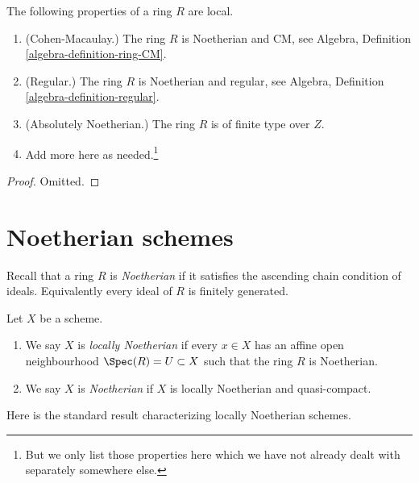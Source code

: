 \begin{lemma}
\label{lemma-properties-local}
The following properties of a ring $R$ are local.
\begin{enumerate}
\item (Cohen-Macaulay.)
The ring $R$ is Noetherian and CM, see
Algebra, Definition \ref{algebra-definition-ring-CM}.
\item (Regular.)
The ring $R$ is Noetherian and regular, see
Algebra, Definition \ref{algebra-definition-regular}.
\item (Absolutely Noetherian.)
The ring $R$ is of finite type over $Z$.
\item Add more here as needed.\footnote{But we only list those properties
here which we have not already dealt with separately somewhere else.}
\end{enumerate}
\end{lemma}

\begin{proof}
Omitted.
\end{proof}















\section{Noetherian schemes}
\label{section-noetherian}

\noindent
Recall that a ring $R$ is {\it Noetherian} if it satisfies the ascending
chain condition of ideals. Equivalently every ideal of $R$ is finitely
generated.

\begin{definition}
\label{definition-noetherian}
Let $X$ be a scheme.
\begin{enumerate}
\item We say $X$ is {\it locally Noetherian} if every
$x \in X$ has an affine open neighbourhood
$\Spec(R) = U \subset X$ such that the ring $R$ is Noetherian.
\item We say $X$ is {\it Noetherian} if $X$ is locally Noetherian
and quasi-compact.
\end{enumerate}
\end{definition}

\noindent
Here is the standard result characterizing locally Noetherian schemes.

